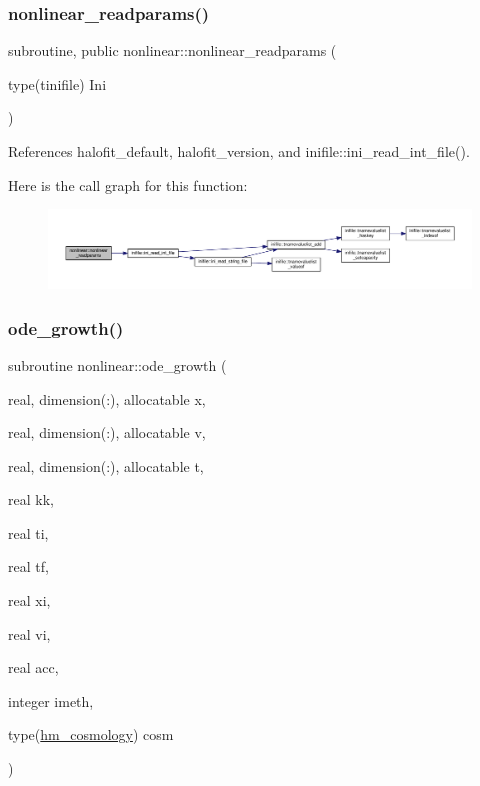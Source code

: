 \subsubsection{\texorpdfstring{nonlinear\+\_\+readparams()}{nonlinear\_readparams()}}
{\footnotesize\ttfamily subroutine, public nonlinear\+::nonlinear\+\_\+readparams (\begin{DoxyParamCaption}\item[{type(tinifile)}]{Ini }\end{DoxyParamCaption})}



References halofit\+\_\+default, halofit\+\_\+version, and inifile\+::ini\+\_\+read\+\_\+int\+\_\+file().

Here is the call graph for this function\+:
\nopagebreak
\begin{figure}[H]
\begin{center}
\leavevmode
\includegraphics[width=350pt]{namespacenonlinear_ada72232da7963dc507bfa2f4d346e7ec_cgraph}
\end{center}
\end{figure}
\mbox{\label{namespacenonlinear_a26b787bf515ef27795b9dbbed39b2e34}} 
\subsubsection{\texorpdfstring{ode\+\_\+growth()}{ode\_growth()}}
{\footnotesize\ttfamily subroutine nonlinear\+::ode\+\_\+growth (\begin{DoxyParamCaption}\item[{real, dimension(\+:), allocatable}]{x,  }\item[{real, dimension(\+:), allocatable}]{v,  }\item[{real, dimension(\+:), allocatable}]{t,  }\item[{real}]{kk,  }\item[{real}]{ti,  }\item[{real}]{tf,  }\item[{real}]{xi,  }\item[{real}]{vi,  }\item[{real}]{acc,  }\item[{integer}]{imeth,  }\item[{type(\mbox{\hyperlink{structnonlinear_1_1hm__cosmology}{hm\+\_\+cosmology}})}]{cosm }\end{DoxyParamCaption})\hspace{0.3cm}{\ttfamily [private]}}



